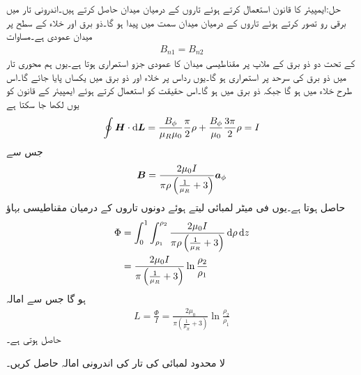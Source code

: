 حل:ایمپیئر کا قانون استعمال کرتے ہوئے تاروں کے درمیان میدان حاصل کرتے ہیں۔اندرونی تار میں برقی رو  تصور کرتے ہوئے تاروں کے درمیان میدان  سمت میں پیدا ہو گا۔ذو برق اور خلاء کے سطح پر میدان عمودی ہے۔مساوات 
\begin{align*}
B_{n1}=B_{n2}
\end{align*}
 کے تحت دو ذو برق کے ملاپ پر مقناطیسی میدان کا عمودی جزو استمراری ہوتا ہے۔یوں ہم محوری تار میں ذو برق کی سرحد پر  استمراری ہو گا۔یوں رداس  پر خلاء اور ذو برق میں یکساں  پایا جائے گا۔اس طرح خلاء میں  ہو گا جبکہ ذو برق میں  ہو گا۔اس حقیقت کو استعمال کرتے ہوئے ایمپیئر کے قانون کو یوں لکھا جا سکتا ہے
\begin{align*}
\oint \kvec{H} \cdot \dif \kvec{L}=\frac{B_{\phi}}{\mu_R \mu_0} \frac{\pi}{2} \rho+\frac{B_{\phi}}{\mu_0} \frac{3\pi}{2} \rho=I
\end{align*} 
جس سے 
\begin{align*}
{\ensuremath{{\boldsymbol{B}}}}=\frac{2\mu_0 I}{\pi \rho \left(\frac{1}{\mu_R}+3\right)} {\boldsymbol{a}}_{\phi}
\end{align*}
حاصل ہوتا ہے۔یوں فی میٹر لمبائی لیتے ہوئے دونوں تاروں کے درمیان مقناطیسی بہاؤ
\begin{align*}
\Phi&=\int_0^{1} \int_{\rho_1}^{\rho_2} \frac{2\mu_0 I}{\pi \rho \left(\frac{1}{\mu_R}+3\right)} \dif \rho \dif z\\
&=\frac{2\mu_0 I}{\pi  \left(\frac{1}{\mu_R}+3\right)} \ln \frac{\rho_2}{\rho_1}
\end{align*}
ہو گا جس سے امالہ
\begin{align*}
L=\frac{\Phi}{I}=\frac{2\mu_0}{\pi  \left(\frac{1}{\mu_R}+3\right)} \ln \frac{\rho_2}{\rho_1}
\end{align*}
حاصل ہوتی ہے۔

\quad لا محدود لمبائی کی تار کی اندرونی امالہ حاصل کریں۔

